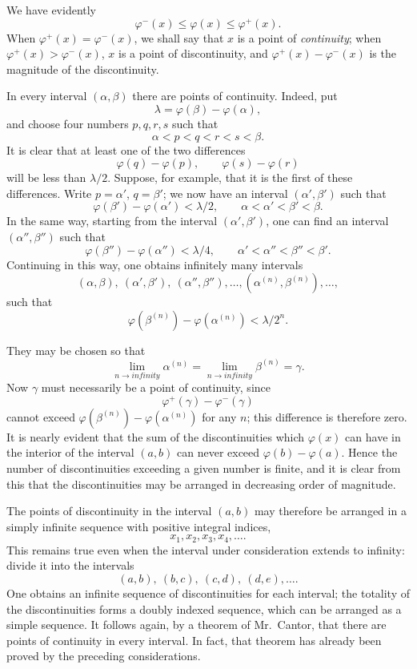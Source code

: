\documentclass[
  paper=b5,
  fontsize=13pt,
  twoside,
  headings=normal,
  bookmarkpackage=false
]{scrartcl}
\theoremstyle{stieltjesplain}
\theoremstyle{stieltjesdefinition}
\def\frac#1#2{#1/#2}%
\def\infty{infinity}%
\begin{document}
We have evidently
\[
  \varphi^{-}(x)\leq \varphi(x)\leq \varphi^{+}(x).
\]
When $\varphi^{+}(x)=\varphi^{-}(x)$, we shall say that $x$ is a point of \emph{continuity}; when $\varphi^{+}(x)>\varphi^{-}(x)$, $x$ is a point of discontinuity, and $\varphi^{+}(x)-\varphi^{-}(x)$ is the magnitude of the discontinuity.

In every interval $(\alpha,\beta)$ there are points of continuity. Indeed, put
\[
  \lambda=\varphi(\beta)-\varphi(\alpha),
\]
and choose four numbers $p,q,r,s$ such that
\[
  \alpha<p<q<r<s<\beta.
\]
It is clear that at least one of the two differences
\[
  \varphi(q)-\varphi(p),\qquad \varphi(s)-\varphi(r)
\]
will be less than $\lambda/2$. Suppose, for example, that it is the first of these differences. Write $p=\alpha'$, $q=\beta'$; we now have an interval $(\alpha',\beta')$ such that
\[
  \varphi(\beta')-\varphi(\alpha')<\frac{\lambda}{2},
  \qquad
  \alpha<\alpha'<\beta'<\beta.
\]
In the same way, starting from the interval $(\alpha',\beta')$, one can find an interval $(\alpha'',\beta'')$ such that
\[
  \varphi(\beta'')-\varphi(\alpha'')<\frac{\lambda}{4},
  \qquad
  \alpha'<\alpha''<\beta''<\beta'.
\]
Continuing in this way, one obtains infinitely many intervals
\[
  (\alpha,\beta),\ (\alpha',\beta'),\ (\alpha'',\beta''),\ldots,
  (\alpha^{(n)},\beta^{(n)}),\ldots,
\]
such that
\[
  \varphi(\beta^{(n)})-\varphi(\alpha^{(n)})<\frac{\lambda}{2^n}.
\]

They may be chosen so that
\[
  \lim_{n\to\infty}\alpha^{(n)}=\lim_{n\to\infty}\beta^{(n)}=\gamma.
\]
Now $\gamma$ must necessarily be a point of continuity, since
\[
  \varphi^{+}(\gamma)-\varphi^{-}(\gamma)
\]
cannot exceed $\varphi(\beta^{(n)})-\varphi(\alpha^{(n)})$ for any $n$; this difference is therefore zero. It is nearly evident that the sum of the discontinuities which $\varphi(x)$ can have in the interior of the interval $(a,b)$ can never exceed $\varphi(b)-\varphi(a)$. Hence the number of discontinuities exceeding a given number is finite, and it is clear from this that the discontinuities may be arranged in decreasing order of magnitude.

The points of discontinuity in the interval $(a,b)$ may therefore be arranged in a simply infinite sequence with positive integral indices,
\[
  x_1,x_2,x_3,x_4,\ldots.
\]
This remains true even when the interval under consideration extends to infinity: divide it into the intervals
\[
  (a,b),\ (b,c),\ (c,d),\ (d,e),\ldots.
\]
One obtains an infinite sequence of discontinuities for each interval; the totality of the discontinuities forms a doubly indexed sequence, which can be arranged as a simple sequence. It follows again, by a theorem of Mr.~Cantor, that there are points of continuity in every interval. In fact, that theorem has already been proved by the preceding considerations.
\end{document}
